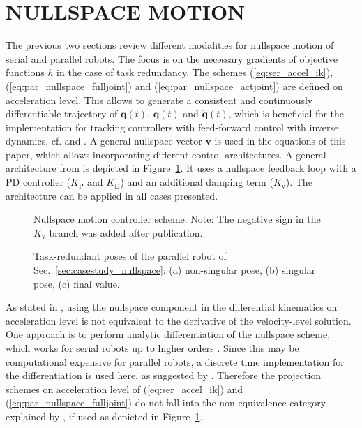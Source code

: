 \documentclass[a4paper,twoside]{article}
\begin{document}
\section{\uppercase{Nullspace Motion}}
\label{sec:control_loop}

The previous two sections review different modalities for nullspace motion of serial and parallel robots.
The focus is on the necessary gradients of objective functions $h$ in the case of task redundancy.
The schemes (\ref{eq:ser_accel_ik}), (\ref{eq:par_nullspace_fulljoint}) and (\ref{eq:par_nullspace_actjoint}) are defined on acceleration level.
This allows to generate a consistent and continuously differentiable trajectory of $\bm{q}(t)$, $\dot{\bm{q}}(t)$ and $\ddot{\bm{q}}(t)$, which is beneficial for the implementation for tracking controllers with feed-forward control with inverse dynamics, cf. \cite{DeLucaOriSic1992} and \cite{ReiterMueGat2018}.
A general nullspace vector $\bm{v}$ is used in the equations of this paper, which allows incorporating different control architectures.
A general architecture from \cite{DeLucaOriSic1992} is depicted in Figure~\ref{fig:control_loop}.
It uses a nullspace feedback loop with a PD controller ($K_\mathrm{P}$ and $K_\mathrm{D}$) and an additional damping term ($K_\mathrm{v}$).
The architecture can be applied in all cases presented.


\begin{figure}[tb]
	
	\caption{Nullspace motion controller scheme. Note: The negative sign in the $K_\mathrm{v}$ branch was added after publication.}
	\label{fig:control_loop}
	\vspace{-0.2cm}
\end{figure}


\begin{figure}[tb] %
	
	\caption{Task-redundant poses of the parallel robot of Sec.~\ref{sec:casestudy_nullspace}: (a) non-singular pose, (b) singular pose, (c) final value.}
	\label{fig:pkm_poses}
\end{figure}

As stated in \cite{ReiterMueGat2018}, using the nullspace component in the differential kinematics on acceleration level is not equivalent to the derivative of the velocity-level solution.
One approach is to perform analytic differentiation of the nullspace scheme, which works for serial robots up to higher orders \cite{ReiterMueGat2018}.
Since this may be computational expensive for parallel robots, a discrete time implementation for the differentiation is used here, as suggested by \cite{DeLucaOriSic1992}.
Therefore the projection schemes on acceleration level of (\ref{eq:ser_accel_ik}) and (\ref{eq:par_nullspace_fulljoint}) do not fall into the non-equivalence category explained by \cite{ReiterMueGat2018}, if used as depicted in Figure~\ref{fig:control_loop}.
\end{document}
